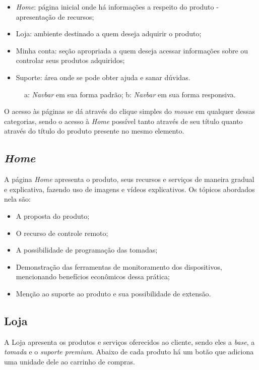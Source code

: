 \documentclass[a4paper, 12pt]{article}
\begin{document}
\begin{itemize}
\item \textit{Home}: página inicial onde há informações a respeito do produto - apresentação de recursos;
\item Loja: ambiente destinado a quem deseja adquirir o produto;
\item Minha conta: seção apropriada a quem deseja acessar informações sobre ou controlar seus produtos adquiridos;
\item Suporte: área onde se pode obter ajuda e sanar dúvidas.
\end{itemize}

\begin{figure}[!ht]
	\centering
	\caption{a: \textit{Navbar} em sua forma padrão;  b: \textit{Navbar} em sua forma responsiva.}
	\label{fig:navbar}
\end{figure}

O acesso às páginas se dá através do clique simples do \textit{mouse} em qualquer dessas categorias, sendo o acesso à \textit{Home} possível tanto através de seu título quanto através do título do produto presente no mesmo elemento.

\subsection{\textit{Home}}

A página \textit{Home} apresenta o produto, seus recursos e serviços de maneira gradual e explicativa, fazendo uso de imagens e vídeos explicativos. Os tópicos abordados nela são:

\begin{itemize}
\item A proposta do produto;
\item O recurso de controle remoto;
\item A possibilidade de programação das tomadas;
\item Demonstração das ferramentas de monitoramento dos dispositivos, mencionando benefícios econômicos dessa prática;
\item Menção ao suporte ao produto e sua possibilidade de extensão.
\end{itemize}

\subsection{Loja}

A Loja apresenta os produtos e serviços oferecidos ao cliente, sendo eles a \textit{base}, a \textit{tomada} e o \textit{suporte premium}. Abaixo de cada produto há um botão que adiciona uma unidade dele ao carrinho de compras.
\end{document}

